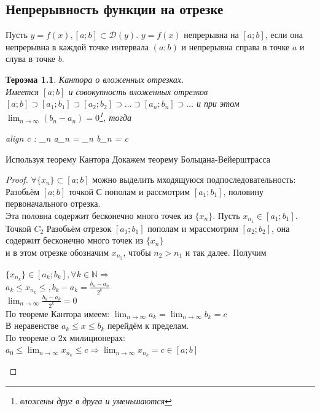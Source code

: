 \documentclass[oneside]{book}
\newcommand{\boxedeq}[2]{\begin{empheq}[box={\fboxsep=6pt\fbox}]{align}\label{#1}#2\end{empheq}}
\newtheorem{thm}{Тероэма}[chapter] %
\begin{document}
\begin{enumerate}
\chapter{Непрерывность функции на отрезке}
Пусть $y = f(x), [a;b] \subset \mathcal{D}(y)$. $y = f(x)$ непрерывна на $[a;b]$, если она непрерывна в каждой точке интервала $(a;b)$ и
непрерывна справа в точке $a$ и слува в точке $b$.
\begin{thm}
    Кантора о вложенных отрезках. \\
    Имеется $[a;b]$ и совокупность вложенных отрезков $[a;b] \supset [a_1;b_1] \supset [a_2;b_2] \supset \dots \supset [a_n; b_n]
    \supset \dots$ и при этом $\lim_{n \rightarrow \infty}{(b_n - a_n)} = 0$\footnote{вложены друг в друга и уменьшаются}, тогда
    \boxedeq{eq:*}{
        \exists c \in [a; b] : \lim_{n \rightarrow \infty}{a_n} = \lim_{n \rightarrow \infty}{b_n} = c
    }
\end{thm}
Используя теорему Кантора Докажем теорему Больцана-Вейерштрасса
\begin{proof}
    $\forall \{x_n\} \subset [a; b]$ можно выделить мходящуюся подпоследовательность:\\
    Разобьём $[a; b]$ точкой С пополам и рассмотрим $[a_1; b_1]$, половину первоначального отрезка.\\
    Эта половна содержит бесконечно много точек из $\{x_n\}$. Пусть $x_{n_1} \in [a_1; b_1]$. \\
    Точкой $C_2$ Разобьём отрезок $[a_1; b_1]$ пополам и мрассмотрим $[a_2; b_2]$, она содержит бесконечно много точек из $\{x_n\}$ \\
    и в этом отрезке обозначим $x_{n_2}$, чтобы $n_2 > n_1$ и так далее. Получим \\
    \begin{center}
        $\{x_{n_k}\} \in [a_k; b_k], \forall k \in \mathbb{N} \Rightarrow$ \\
        $a_k \leq x_{n_k} \leq, b_k - a_k = \frac{b_n - a_n}{2^k}$ \\
        $\lim_{n \rightarrow \infty}{\frac{b_k - a_k}{2^k} = 0}$ \\
        По теореме Кантора имеем: $\lim_{n \rightarrow \infty}{a_k} = \lim_{n \rightarrow \infty}{b_k} = c$\\
        В неравенстве $a_k \leq x \leq b_k$ перейдём к пределам.\\
        По теореме о 2х милиционерах:\\
        $a_0 \leq \lim_{n \rightarrow \infty}{x_{n_k}} \leq c \Rightarrow \lim_{n \rightarrow \infty}{x_{n_k}} = c \in [a; b]$

\end{center}
\end{proof}
\end{enumerate}
\end{document}

